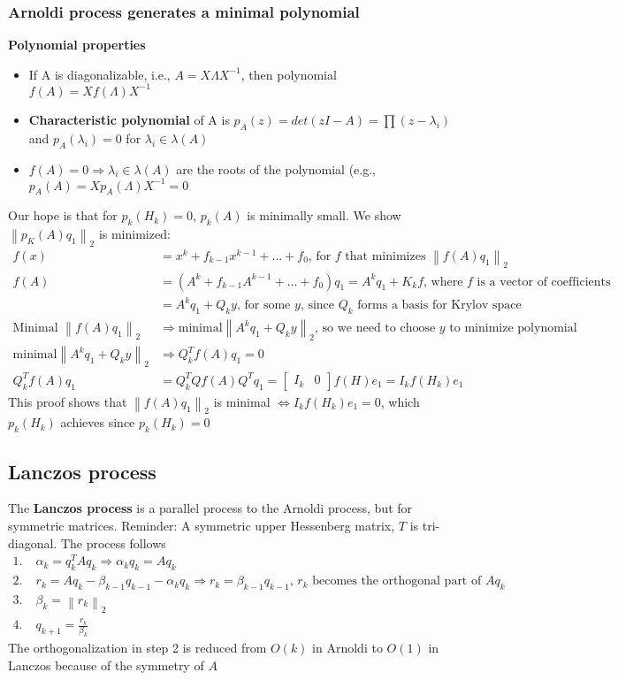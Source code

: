 \documentclass{article}
\newcommand{\norm}[2]{\left\lVert#1\right\rVert_#2}
\begin{document}
\subsubsection{Arnoldi process generates a minimal polynomial}
\textbf{Polynomial properties}
\begin{itemize}
    \item If A is diagonalizable, i.e., $A = X\Lambda X^{-1}$, then polynomial $f(A) = Xf(\Lambda)X^{-1}$
    \item \textbf{Characteristic polynomial} of A is $p_A(z) = det(zI - A) = \prod(z - \lambda_i)$ and $p_A(\lambda_i) = 0$ for $\lambda_i \in \lambda(A)$
    \item $f(A) = 0 \Longrightarrow \lambda_i \in \lambda(A)$ are the roots of the polynomial (e.g., $p_A(A) = Xp_A(\Lambda)X^{-1} = 0$
\end{itemize}
Our hope is that for $p_k(H_k) = 0$, $p_k(A)$ is minimally small. We show $\norm{p_K(A)q_1}{2}$ is minimized:
\begin{align*}
    f(x) &= x^k + f_{k-1}x^{k-1} + \dots + f_0 \textrm{, for $f$ that minimizes } \norm{f(A)q_1}{2}\\
    f(A) &= (A^k + f_{k-1}A^{k-1} + \dots + f_0)q_1 = A^kq_1 + K_kf \textrm{, where $f$ is a vector of coefficients}\\
    &= A^kq_1 + Q_ky \textrm{, for some $y$, since $Q_k$ forms a basis for Krylov space}\\
    \textrm{Minimal }\norm{f(A)q_1}{2} &\Longrightarrow \textrm{minimal} \norm{A^kq_1 + Q_ky}{2} \textrm{, so we need to choose $y$ to minimize polynomial}\\
    \textrm{minimal} \norm{A^kq_1 + Q_ky}{2} & \Longrightarrow Q_k^Tf(A)q_1 = 0\\
    Q_k^Tf(A)q_1 &= Q_k^TQf(A)Q^Tq_1 = \begin{bmatrix} I_k & 0 \end{bmatrix} f(H)e_1 = I_kf(H_k)e_1
\end{align*}
This proof shows that $\norm{f(A)q_1}{2}$ is minimal $\Leftrightarrow I_kf(H_k)e_1=0$, which $p_k(H_k)$ achieves since $p_k(H_k) = 0$ 

\subsection{Lanczos process}
The \textbf{Lanczos process} is a parallel process to the Arnoldi process, but for symmetric matrices. Reminder: A symmetric upper Hessenberg matrix, $T$ is tri-diagonal. The process follows
\begin{align*}
    1. \;& \alpha_k = q_k^TAq_k \Longrightarrow \alpha_kq_k = Aq_k\\
    2. \;& r_k = Aq_k - \beta_{k-1}q_{k-1} - \alpha_kq_k \Longrightarrow r_k = \beta_{k-1}q_{k-1} \textrm{, $r_k$ becomes the orthogonal part of $Aq_k$}\\
    3. \;& \beta_k = \norm{r_k}{2}\\
    4. \;& q_{k+1} = \frac{r_k}{\beta_k}
\end{align*}
The orthogonalization in step 2 is reduced from $O(k)$ in Arnoldi to $O(1)$ in Lanczos because of the symmetry of $A$
\end{document}
